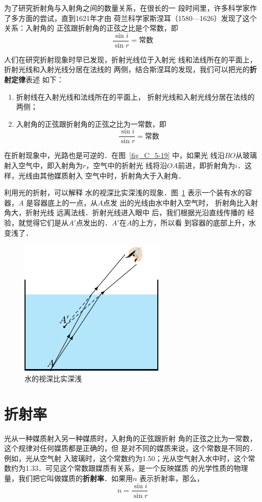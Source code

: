 为了研究折射角与入射角之间的数量关系，在很长的一
段时间里，许多科学家作了多方面的尝试，直到1621年才由
荷兰科学家斯涅耳（1580—1626）发现了这个关系：入射角的
正弦跟折射角的正弦之比是个常数，即
\[\frac{\sin i}{\sin r}=\text{常数}\]

人们在研究折射现象时早已发现，折射光线位于入射光
线和法线所在的平面上，折射光线和入射光线分居在法线的
两侧，结合斯涅耳的发现，我们可以把光的\textbf{折射定律}表述
如下：

\begin{enumerate}
    \item 折射线在入射光线和法线所在的平面上，
折射光线和入射光线分居在法线的两侧；
\item 入射角的正弦跟折射角的正弦之比为一常数，即
\[\frac{\sin i}{\sin r}=\text{常数}\]
\end{enumerate} 

在折射现象中，光路也是可逆的．在图~\ref{fig_C_5-19} 中，如果光
线沿$BO$从玻璃射入空气中，即入射角为$r$，空气中的折射光
线将沿$OA$前进，即折射角为$i$．这样，光线由其他媒质射入
空气中时，折射角大于入射角．

利用光的折射，可以解释
水的视深比实深浅的现象．图~\ref{fig_C_5-20} 表示一个装有水的容器，$A$
是容器底上的一点，从$A$点发
出的光线由水中射入空气时，
折射角比入射角大，折射光线
远离法线．折射光线进入眼中
后，我们根据光沿直线传播的
经验，就觉得它们是从$A'$点发出的．$A'$在$A$的上方，所以看
到容器的底部上升，水变浅了．
\begin{figure}[htbp]
    \centering
    \includegraphics{fig/C/5-20.pdf}
    \caption{水的视深比实深浅}\label{fig_C_5-20}
\end{figure}

\section{折射率} 
    光从一种媒质射入另一种媒质时，入射角的正弦跟折射
    角的正弦之比为一常数，这个规律对任何媒质都是正确的，但
    是对不同的媒质来说，这个常数是不同的．例如，光从空气射
    入玻璃时，这个常数约为1.50；光从空气射入水中时，这个常
    数约为1.33．可见这个常数跟媒质有关系，是一个反映媒质
    的光学性质的物理量，我们把它叫做媒质的\textbf{折射率}．如果用$n$
    表示折射率，那么，
    \[n=\frac{\sin i}{\sin r}\]

